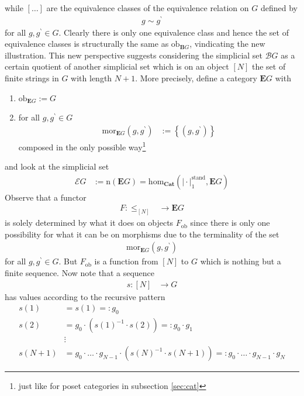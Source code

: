 while $[\ldots]$ are the equivalence classes of the equivalence relation on $G$ defined by
\begin{align*}
  g
  \sim
  g^{\backprime}
\end{align*}
for all $g,g^{\backprime} \in G$.
Clearly there is only one equivalence class and hence the set of equivalence classes is structurally the same as $\mathrm{ob}_{\mathbf{B}G}$, vindicating the new illustration.
This new perspective suggests considering the simplicial set $\mathcal{B}G$ as a certain quotient of another simplicial set which is on an object $[N]$ the set of finite strings in $G$ with length $N + 1$.
More precisely, define a category $\mathbf{E}G$ with
\begin{enumerate}
\item[$\bullet$]
$\mathrm{ob}_{\mathbf{E}G} := G$
\item[$\bullet$]
for all $g,g^{\backprime} \in G$
\begin{align*}
  \mathrm{mor}_{\mathbf{E}G}
  \left(
    g,
    g^{\backprime}
  \right)
  &:=
  \left\lbrace
    \left(
      g,
      g^{\backprime}
    \right)
  \right\rbrace
\end{align*}
composed in the only possible way\footnote{just like for poset categories in subsection \ref{sec:cat}}
\end{enumerate}
and look at the simplicial set
\begin{align*}
  \mathcal{E}G
  &:=
  \mathrm{n}(\mathbf{E}G)
  =
  \mathrm{hom}_{\mathbf{Cat}}
  \left(
    \vert
      \cdot
    \vert_{1}^{\textrm{stand}},
    \mathbf{E}G
  \right)
\end{align*}
Observe that a functor
\begin{align*}
  F
  \colon
  \pmb{\leq}_{[N]}
  &\rightarrow
  \mathbf{E}G
\end{align*}
is solely determined by what it does on objects $F_{\mathrm{ob}}$ since there is only one possibility for what it can be on morphisms due to the terminality of the set
\begin{align*}
  \mathrm{mor}_{\mathbf{E}G}
  \left(
    g,
    g^{\backprime}
  \right)
\end{align*}
for all $g,g^{\backprime} \in G$.
But $F_{\mathrm{ob}}$ is a function from $[N]$ to $G$ which is nothing but a finite sequence.
Now note that a sequence
\begin{align*}
  s
  \colon
  [N]
  &\rightarrow
  G
\end{align*}
has values according to the recursive pattern
\begin{align*}
  s(1)
  &=
  s(1)
  =:
  g_{0}
  \\
  s(2)
  &=
  g_{0}
  \cdot
  \left(
    s(1)^{-1}
    \cdot
    s(2)
  \right)
  =:
  g_{0}
  \cdot
  g_{1}
  \\
  &\vdots
  \\
  s(N+1)
  &=
  g_{0}
  \cdot
  \ldots
  \cdot
  g_{N-1}
  \cdot
  \left(
    s(N)^{-1}
    \cdot
    s(N+1)
  \right)
  =:
  g_{0}
  \cdot
  \ldots
  \cdot
  g_{N-1}
  \cdot
  g_{N}
\end{align*}
